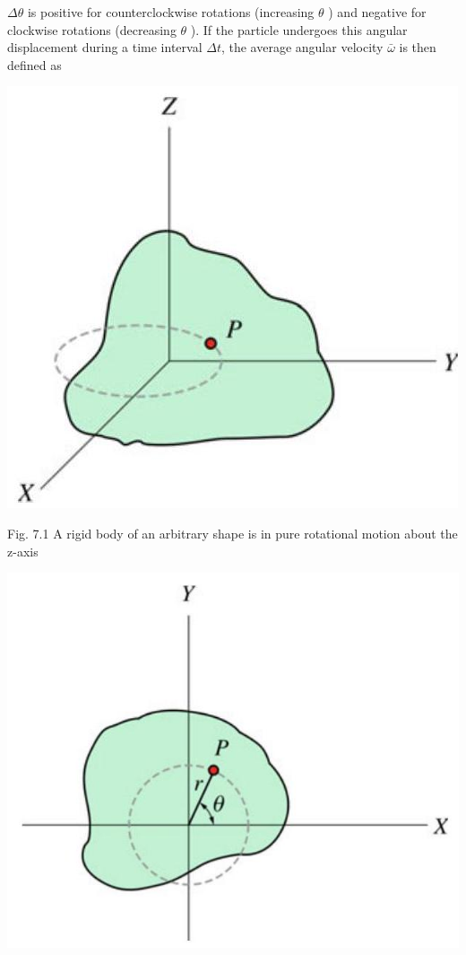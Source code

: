\documentclass[10pt]{article}
\begin{document}
$\Delta \theta$ is positive for counterclockwise rotations (increasing $\theta$ ) and negative for clockwise rotations (decreasing $\theta$ ). If the particle undergoes this angular displacement during a time interval $\Delta t$, the average angular velocity $\bar{\omega}$ is then defined as

\begin{center}
\includegraphics[max width=\textwidth]{2024_09_13_db1f357d2aad0a03eb2eg-112}
\end{center}

Fig. 7.1 A rigid body of an arbitrary shape is in pure rotational motion about the z-axis

\begin{center}
\includegraphics[max width=\textwidth]{2024_09_13_db1f357d2aad0a03eb2eg-112(1)}
\end{center}
\end{document}
